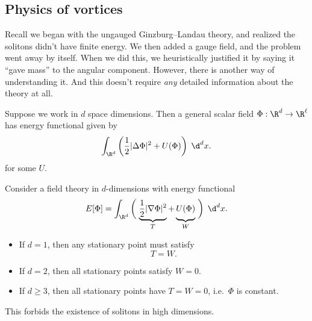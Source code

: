 \documentclass[a4paper]{article}
\begin{document}
\subsection{Physics of vortices}
Recall we began with the ungauged Ginzburg--Landau theory, and realized the solitons didn't have finite energy. We then added a gauge field, and the problem went away by itself. When we did this, we heuristically justified it by saying it ``gave mass'' to the angular component. However, there is another way of understanding it. And this doesn't require \emph{any} detailed information about the theory at all.

Suppose we work in $d$ space dimensions. Then a general scalar field $\Phi: \R^d \to \R^\ell$ has energy functional given by
\[
  \int_{\R^d} \left(\frac{1}{2} |\Delta \Phi|^2 + U(\Phi)\right)\;\d^d x.
\]
for some $U$.

\begin{thm}
  Consider a field theory in $d$-dimensions with energy functional
  \[
    E[\Phi] = \int_{\R^d}\left(\vphantom{\frac{1}{2}}\right.\underbrace{\frac{1}{2} |\nabla \Phi|^2}_{T} + \underbrace{U(\Phi)\vphantom{\frac{1}{2}}}_W\left.\vphantom{\frac{1}{2}}\right)\;\d^d x.
  \]
  \begin{itemize}
    \item If $d = 1$, then any stationary point must satisfy
      \[
        T = W.
      \]
    \item If $d = 2$, then all stationary points satisfy $W = 0$.
    \item If $d \geq 3$, then all stationary points have $T = W = 0$, i.e.\ $\Phi$ is constant.
  \end{itemize}
\end{thm}
This forbids the existence of solitons in high dimensions.
\end{document}
